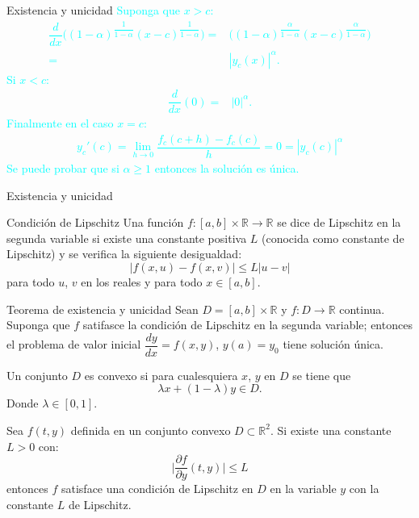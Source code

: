 \begin{frame}{Existencia y unicidad}
\textcolor{cyan}{
Suponga que $x>c$:
\begin{align*}
\dfrac{d}{dx}\bigg((1-\alpha)^{\dfrac{1}{1-\alpha}}(x-c)^{\dfrac{1}{1-\alpha}}\bigg)=&\bigg((1-\alpha)^{\dfrac{\alpha}{1-\alpha}}(x-c)^{\dfrac{\alpha}{1-\alpha}}\bigg)\\
=&|y_c(x)|^{\alpha}.
\end{align*}
Si $x<c$:
\begin{align*}
\dfrac{d}{dx}(0)=&|0|^\alpha.
\end{align*}
Finalmente en el caso $x=c$:
\begin{align*}
y_c'(c)=\lim_{h\rightarrow 0}\dfrac{f_c(c+h)-f_c(c)}{h}=0=|y_c(c)|^\alpha
\end{align*}\pause
Se puede probar que si $\alpha\geq 1$ entonces la solución es única. 
}
\end{frame}
\begin{frame}{Existencia y unicidad}
\begin{block}{Condición de Lipschitz}
Una función $f:[a,b]\times \mathbb{R}\rightarrow \mathbb{R}$ se dice de Lipschitz en la segunda variable si existe una constante positiva $L$ (conocida como constante de Lipschitz) y se verifica la siguiente desigualdad:
$$|f(x,u)-f(x,v)|\leq L|u-v|$$
para todo $u$, $v$ en los reales y para todo $x\in [a,b]$. 
\end{block}
\begin{block}{Teorema de existencia y unicidad}
Sean $D=[a,b]\times \mathbb{R}$ y $f:D\rightarrow \mathbb{R}$ continua. Suponga que $f$ satifasce la condición de Lipschitz en la segunda variable; entonces el problema de valor inicial $\dfrac{dy}{dx}=f(x,y)$, $y(a)=y_0$ tiene solución única.
\end{block}
\end{frame}
\begin{frame}
\begin{Def}
Un conjunto $D$ es convexo si para cualesquiera $x$, $y$ en $D$ se tiene que $$\lambda x+(1-\lambda )y\in D.$$
Donde $\lambda\in[0,1].$
\end{Def}
\begin{Teo}[Criterio]
Sea $f(t,y)$ definida en un conjunto convexo $D\subset \mathbb{R}^2.$ Si existe una constante $L>0$ con:
$$\bigg|\dfrac{\partial f}{\partial y}(t,y)\bigg|\leq L$$
entonces $f$ satisface una condición de Lipschitz en $D$ en la variable $y$ con la constante $L$ de Lipschitz.
\end{Teo}
\end{frame}
